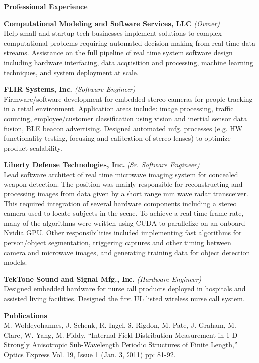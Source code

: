 \documentclass[14pt,letterpaper]{extarticle}
\begin{document}
\bigskip
\noindent\textbf{\large{Professional Experience}}

\newcommand{\experience}[4]{
\medskip
\marginnote{\footnotesize{\textit{#1}}}
\noindent\footnotesize{\textbf{#2} \textit{(#3)}}\\
#4
}

\experience{2020}{Computational Modeling and Software Services, LLC}{Owner}{
Help small and startup tech businesses implement solutions to complex computational problems requiring
automated decision making from real time data streams.  Assistance on the full pipeline of real time
system software design including hardware interfacing, data acquisition and processing, machine learning
techniques, and system deployment at scale.
}

\experience{2015-2020}{FLIR Systems, Inc.}{Software Engineer}{
Firmware/software development for embedded stereo cameras
for people tracking in a retail environment. Application areas include: image processing, traffic counting,
employee/customer classification using vision and inertial sensor data fusion, BLE beacon advertising.
Designed automated mfg. processes (e.g. HW functionality testing, focusing and calibration of stereo
lenses) to optimize product scalability.
}

\experience{2019}{Liberty Defense Technologies, Inc.}{Sr. Software Engineer}{
Lead software architect of real time microwave imaging system for concealed weapon detection. The position
was mainly responsible for reconstructing and processing images from data given by a short range mm wave radar
transceiver. This required integration of several hardware components including a stereo camera used to locate
subjects in the scene.  To achieve a real time frame rate, many of the algorithms were written using CUDA to
parallelize on an onboard Nvidia GPU.  Other responsibilities included implementing fast algorithms for
person/object segmentation, triggering captures and other timing between camera and microwave images, and
generating training data for object detection models.
}

\experience{2010-2013}{TekTone Sound and Signal Mfg., Inc.}{Hardware Engineer}{
Designed embedded hardware for nurse call products deployed in
hospitals and assisted living facilities.  Designed the first UL listed wireless nurse call system.
}

\bigskip
\noindent\textbf{\large{Publications}}\vspace{5.3pt}\\
\noindent
\footnotesize{M. Woldeyohannes, J. Schenk, R. Ingel, S. Rigdon, M. Pate, J. Graham, M. Clare, W. Yang, M. Fiddy, ``Internal Field Distribution Measurement in 1-D Strongly Anisotropic Sub-Wavelength Periodic Structures of Finite Length,'' Optics Express Vol. 19, Issue 1 (Jan. 3, 2011) pp: 81-92.}
\end{document}
